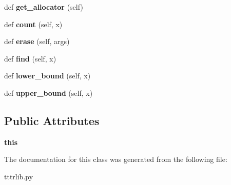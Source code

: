 \begin{DoxyCompactItemize}
def {\bfseries get\+\_\+allocator} (self)
\item 
\mbox{\label{classtttrlib_1_1map__string__string_a5d3a14da17c3162c1fcf077efc07005d}} 
def {\bfseries count} (self, x)
\item 
\mbox{\label{classtttrlib_1_1map__string__string_ad9d4523415e62c27ed870f8d294d6be0}} 
def {\bfseries erase} (self, args)
\item 
\mbox{\label{classtttrlib_1_1map__string__string_af5fbbb10ba04bc80ddfa98a93270a54a}} 
def {\bfseries find} (self, x)
\item 
\mbox{\label{classtttrlib_1_1map__string__string_a669473bdcfec8e5d5f2b05f762c006f4}} 
def {\bfseries lower\+\_\+bound} (self, x)
\item 
\mbox{\label{classtttrlib_1_1map__string__string_a4da697171dcac1c0127e98b7f6bf2cfd}} 
def {\bfseries upper\+\_\+bound} (self, x)
\end{DoxyCompactItemize}
\subsection*{Public Attributes}
\begin{DoxyCompactItemize}
\item 
\mbox{\label{classtttrlib_1_1map__string__string_aa79a1e4aecdde9067b322de953c05879}} 
{\bfseries this}
\end{DoxyCompactItemize}


The documentation for this class was generated from the following file\+:\begin{DoxyCompactItemize}
\item 
tttrlib.\+py\end{DoxyCompactItemize}
